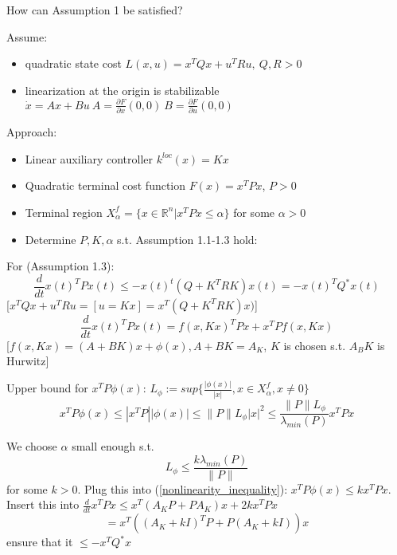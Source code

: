 How can Assumption 1 be satisfied?

Assume:
\begin{itemize}
\item quadratic state cost $L(x,u) = x^TQx + u^TRu, \ Q,R >0$
\item linearization at the origin is stabilizable 
$\dot x = Ax+Bu \ A = \frac{\partial F}{\partial x}(0,0) \ B = \frac{\partial F}{\partial u}(0,0)$
\end{itemize} 

Approach: 
\begin{itemize}
\item Linear auxiliary controller $k^{loc}(x)=Kx$
\item Quadratic terminal cost function $F(x) = x^TPx$, $P > 0$
\item Terminal region $X_{\alpha}^f = \{x \in \mathbb{R}^n | x^TPx \leq \alpha\}$ for some $\alpha > 0$
\item Determine $P,K,\alpha$ s.t. Assumption 1.1-1.3 hold:
\end{itemize}
For (Assumption 1.3):
\begin{equation*}
\frac{d}{dt}x(t)^TPx(t) \leq - x(t)^t(Q + K^TRK)x(t) = - x(t)^TQ^*x(t)
\end{equation*}
[$x^TQx + u^TRu = [u=Kx] = x^T(Q+K^TRK)x)$]
\begin{equation*}
\frac{d}{dt}x(t)^TPx(t) = f(x,Kx)^TPx + x^TPf(x,Kx)
\end{equation*}
[$f(x,Kx) = (A+BK)x+\phi(x), A+BK = A_K$, $K$ is chosen s.t. $A_BK$ is Hurwitz]

Upper bound for $x^TP\phi(x)$:
$L_{\phi} := sup\{ \frac{|\phi(x)|}{|x|}, x \in X_{\alpha}^{f}, x \neq 0\}$
\begin{equation}\label{nonlinearity_inequality}
x^TP\phi(x) \leq |x^TP| |\phi(x)| \leq \| P\| L_{\phi} |x|^2 \leq \frac{\|P\|L_{\phi}}{\lambda_{min}(P)}x^TPx
\end{equation}

We choose $\alpha$ small enough s.t. 
\begin{equation}\label{alpha_choice}
L_{\phi} \leq \frac{k \lambda_{min}(P)}{\|P\|} 
\end{equation}
for some $k > 0$. Plug this into (\ref{nonlinearity_inequality}): $x^TP\phi(x) \leq kx^TPx$. 
Insert this into $\frac{d}{dt}x^TPx \leq x^T(A_KP + PA_K)x + 2kx^TPx$
\begin{equation*}
= x^T((A_K + kI)^TP + P(A_K+kI))x
\end{equation*}
ensure that it $\leq - x^TQ^*x$

